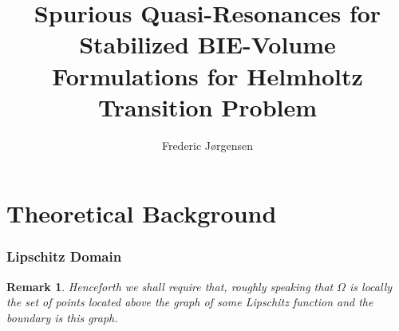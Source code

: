 \documentclass[10pt,journal,compsoc, onecolumn]{IEEEtran}
\newtheorem{remark}[theorem]{Remark}
\begin{document}
\title{Spurious Quasi-Resonances for Stabilized BIE-Volume Formulations for Helmholtz Transition Problem}

\author{Frederic Jørgensen}









\maketitle

\IEEEdisplaynontitleabstractindextext
\IEEEpeerreviewmaketitle


\section{Theoretical Background}

\subsubsection{Lipschitz Domain}


\begin{remark}
Henceforth we shall require that, roughly speaking that \(\Omega\)  is locally the set of points located above the graph of some Lipschitz function and the boundary is this graph. 
\end{remark}
\end{document}
